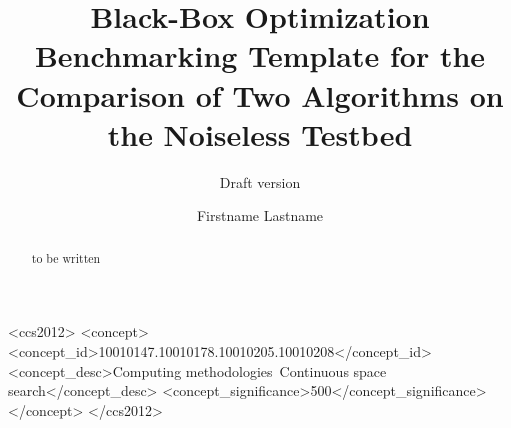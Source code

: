 \documentclass[sigconf]{acmart}
\begin{document}
\title{Black-Box Optimization Benchmarking Template for the Comparison of Two Algorithms on the Noiseless Testbed}
\renewcommand{\shorttitle}{Black-Box Optimization Benchmarking Template for Two Algorithms}
\subtitle{Draft version}



\author{Firstname Lastname}
%
%
%
%
%
%
%

\renewcommand{\shortauthors}{Firstname Lastname et. al.}


\begin{abstract}
to be written
\end{abstract}


%
%
 \begin{CCSXML}
<ccs2012>
<concept>
<concept_id>10010147.10010178.10010205.10010208</concept_id>
<concept_desc>Computing methodologies~Continuous space search</concept_desc>
<concept_significance>500</concept_significance>
</concept>
</ccs2012>
\end{CCSXML}
\end{document}
